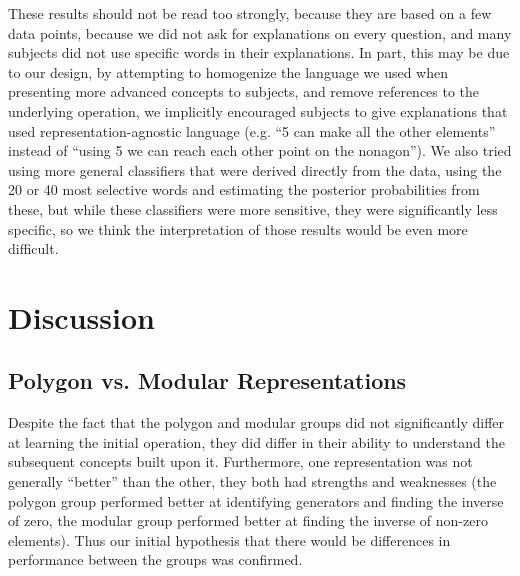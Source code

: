 \documentclass[man,10pt]{apa6}
\begin{document}
These results should not be read too strongly, because they are based on a few data points, because we did not ask for explanations on every question, and many subjects did not use specific words in their explanations. In part, this may be due to our design, by attempting to homogenize the language we used when presenting more advanced concepts to subjects, and remove references to the underlying operation, we implicitly encouraged subjects to give explanations that used representation-agnostic language (e.g. ``5 can make all the other elements'' instead of ``using 5 we can reach each other point on the nonagon''). We also tried using more general classifiers that were derived directly from the data, using the 20 or 40 most selective words and estimating the posterior probabilities from these, but while these classifiers were more sensitive, they were significantly less specific, so we think the interpretation of those results would be even more difficult. 
\section{Discussion}
\subsection{Polygon vs. Modular Representations}
Despite the fact that the polygon and modular groups did not significantly differ at learning the initial operation, they did differ in their ability to understand the subsequent concepts built upon it. Furthermore, one representation was not generally ``better'' than the other, they both had strengths and weaknesses (the polygon group performed better at identifying generators and finding the inverse of zero, the modular group performed better at finding the inverse of non-zero elements). Thus our initial hypothesis that there would be differences in performance between the groups was confirmed.\\ 
\end{document}
